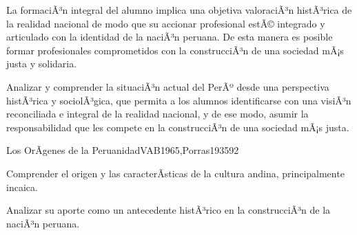 \begin{syllabus}


\begin{justification}
La formaciÃ³n integral del alumno implica una objetiva valoraciÃ³n histÃ³rica de la 
realidad nacional de modo que su accionar profesional estÃ© integrado y articulado 
con la identidad de la naciÃ³n peruana. De esta manera es posible formar profesionales 
comprometidos con la construcciÃ³n de una sociedad mÃ¡s justa y solidaria.
\end{justification}

\begin{goals}
\item Analizar y comprender la situaciÃ³n actual del PerÃº desde una perspectiva 
histÃ³rica y sociolÃ³gica, que permita a los alumnos identificarse con una visiÃ³n 
reconciliada e integral de la realidad nacional, y de ese modo, asumir la 
responsabilidad que les compete en la construcciÃ³n de una sociedad mÃ¡s justa.
\end{goals}

\begin{outcomes}
\end{outcomes}

\begin{unit}{Los OrÃ­genes de la Peruanidad}{VAB1965,Porras1935}{9}{2}
\begin{topics}
      \item 
\end{topics}
\begin{unitgoals}
      \item Comprender el origen y las caracterÃ­sticas de la cultura andina, principalmente incaica.
      \item Analizar su aporte como un antecedente histÃ³rico en la construcciÃ³n de la naciÃ³n peruana.
\end{unitgoals}
\end{unit}


\end{syllabus}
